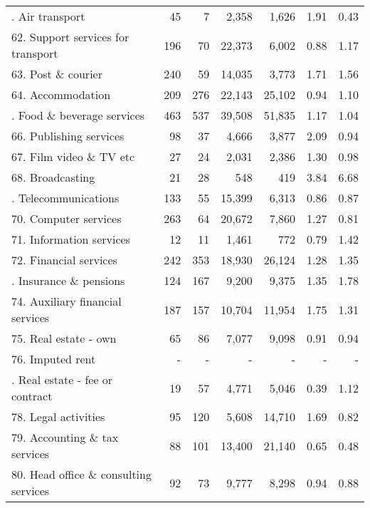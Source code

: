 {\begin{center}
\begin{longtable}{lrrrrrr}
     \hdashline[1pt/1pt]
    61. Air transport & 45    & 7     & 2,358 & 1,626 & 1.91  & 0.43 \bigstrut[t]\\
    62. Support services for transport & 196   & 70    & 22,373 & 6,002 & 0.88  & 1.17 \\
    63. Post \& courier & 240   & 59    & 14,035 & 3,773 & 1.71  & 1.56 \\
    64. Accommodation & 209   & 276   & 22,143 & 25,102 & 0.94  & 1.10 \bigstrut[b]\\
     \hdashline[1pt/1pt]
    65. Food \& beverage services & 463   & 537   & 39,508 & 51,835 & 1.17  & 1.04 \bigstrut[t]\\
    66. Publishing services & 98    & 37    & 4,666 & 3,877 & 2.09  & 0.94 \\
    67. Film video \& TV etc & 27    & 24    & 2,031 & 2,386 & 1.30  & 0.98 \\
    68. Broadcasting & 21    & 28    & 548   & 419   & 3.84  & 6.68 \bigstrut[b]\\
     \hdashline[1pt/1pt]
    69. Telecommunications & 133   & 55    & 15,399 & 6,313 & 0.86  & 0.87 \bigstrut[t]\\
    70. Computer services & 263   & 64    & 20,672 & 7,860 & 1.27  & 0.81 \\
    71. Information services & 12    & 11    & 1,461 & 772   & 0.79  & 1.42 \\
    72. Financial services & 242   & 353   & 18,930 & 26,124 & 1.28  & 1.35 \bigstrut[b]\\
     \hdashline[1pt/1pt]
    73. Insurance \& pensions & 124   & 167   & 9,200 & 9,375 & 1.35  & 1.78 \bigstrut[t]\\
    74. Auxiliary financial services & 187   & 157   & 10,704 & 11,954 & 1.75  & 1.31 \\
    75. Real estate - own & 65    & 86    & 7,077 & 9,098 & 0.91  & 0.94 \\
    76. Imputed rent & -     & -     & -     & -     & -     & - \bigstrut[b]\\
     \hdashline[1pt/1pt]
    77. Real estate - fee or contract & 19    & 57    & 4,771 & 5,046 & 0.39  & 1.12 \bigstrut[t]\\
    78. Legal activities & 95    & 120   & 5,608 & 14,710 & 1.69  & 0.82 \\
    79. Accounting \& tax services & 88    & 101   & 13,400 & 21,140 & 0.65  & 0.48 \\
    80. Head office \& consulting services & 92    & 73    & 9,777 & 8,298 & 0.94  & 0.88 \bigstrut[b]\\

\end{longtable}
\end{center}}
